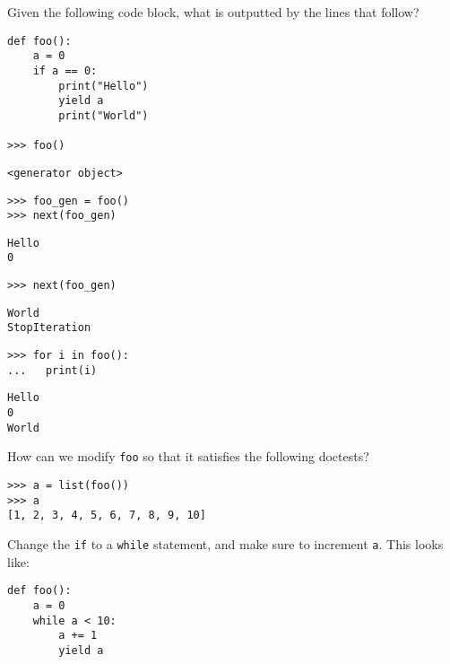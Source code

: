 \begin{blocksection}
\question Given the following code block, what is outputted by the lines that follow?

\begin{lstlisting}
def foo():
    a = 0
    if a == 0:
        print("Hello")
        yield a
        print("World")

>>> foo()
\end{lstlisting}
\begin{solution}[0.25in]
\begin{lstlisting}
<generator object>
\end{lstlisting}
\end{solution}

\begin{lstlisting}
>>> foo_gen = foo()
>>> next(foo_gen)
\end{lstlisting}

\begin{solution}[0.5in]
\begin{lstlisting}
Hello
0
\end{lstlisting}
\end{solution}

\begin{lstlisting}
>>> next(foo_gen)
\end{lstlisting}

\begin{solution}[0.5in]
\begin{lstlisting}
World
StopIteration
\end{lstlisting}
\end{solution}
\end{blocksection}

\begin{lstlisting}
>>> for i in foo():
...   print(i)
\end{lstlisting}

\begin{solution}[0.5in]
\begin{lstlisting}
Hello
0
World
\end{lstlisting}
\end{solution}
\begin{blocksection}
\question How can we modify \lstinline$foo$ so that it satisfies the following doctests?
\begin{lstlisting}
>>> a = list(foo())
>>> a
[1, 2, 3, 4, 5, 6, 7, 8, 9, 10]
\end{lstlisting}

\begin{solution}[0.50in]
Change the \lstinline$if$ to a \lstinline$while$ statement, and make sure to increment
\lstinline$a$. This looks like:

\begin{lstlisting}
def foo():
    a = 0
    while a < 10:
        a += 1
        yield a
\end{lstlisting}
\end{solution}
\end{blocksection}
